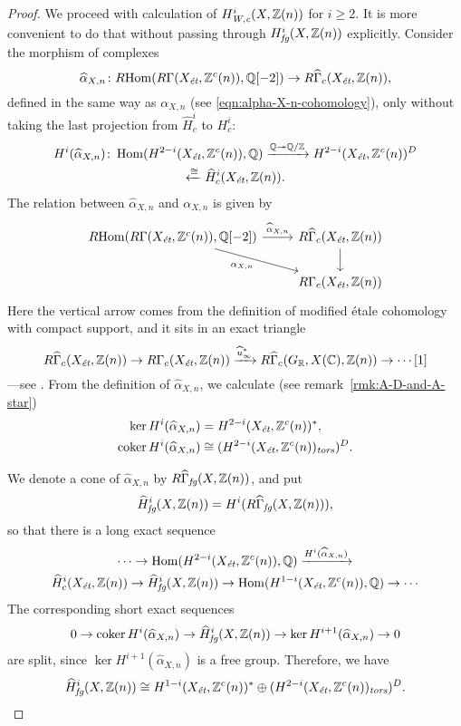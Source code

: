 \documentclass[draft]{article}
\numberwithin{equation}{section}
\begin{document}
\begin{proof}
  \vspace{1em}

  We proceed with calculation of $H^i_\Wc (X, \ZZ(n))$ for $i \ge 2$. It is
  more convenient to do that without passing through $H^i_\fg (X, \ZZ(n))$
  explicitly. Consider the morphism of complexes
  \[ \widehat{\alpha}_{X,n}\colon
    \RHom (R\Gamma (X_\et, \ZZ^c(n)), \QQ[-2]) \to
    R\widehat{\Gamma}_c (X_\et, \ZZ(n)), \]
  defined in the same way as $\alpha_{X,n}$
  (see \eqref{eqn:alpha-X-n-cohomology}), only without taking the last
  projection from $\widehat{H}^i_c$ to $H^i_c$:
  \begin{multline*}
    H^i (\widehat{\alpha}_{X,n})\colon \Hom (H^{2-i} (X_\et, \ZZ^c(n)), \QQ)
    \xrightarrow{\QQ \twoheadrightarrow \QQ/\ZZ}
    H^{2-i} (X_\et, \ZZ^c(n))^D \\
    \xleftarrow{\cong} \widehat{H}^i_c (X_\et, \ZZ(n)).
  \end{multline*}
  The relation between $\widehat{\alpha}_{X,n}$ and $\alpha_{X,n}$
  is given by
  \[ \begin{tikzcd}
      \RHom (R\Gamma (X_\et, \ZZ^c(n)), \QQ[-2]) \ar{r}{\widehat{\alpha}_{X,n}}\ar{dr}[swap]{\alpha_{X,n}} & R\widehat{\Gamma}_c (X_\et, \ZZ(n)) \ar{d} \\
      & R\Gamma_c (X_\et, \ZZ(n))
    \end{tikzcd} \]
  Here the vertical arrow comes from the definition of modified \'{e}tale
  cohomology with compact support, and it sits in an exact triangle
  \[ R\widehat{\Gamma}_c (X_\et, \ZZ(n)) \to
    R\Gamma_c (X_\et, \ZZ(n)) \xrightarrow{\widehat{u}^*_\infty}
    R\widehat{\Gamma}_c (G_\RR, X(\CC), \ZZ(n)) \to \cdots [1] \]
  ---see \cite[Lemma~6.14]{Flach-Morin-2018}.
  From the definition of $\widehat{\alpha}_{X,n}$, we calculate
  (see remark~\ref{rmk:A-D-and-A-star})
  \begin{align*}
    \ker H^i (\widehat{\alpha}_{X,n}) & = H^{2-i} (X_\et, \ZZ^c(n))^*, \\
    \coker H^i (\widehat{\alpha}_{X,n}) & \cong (H^{2-i} (X_\et, \ZZ^c (n))_\tors)^D.
  \end{align*}

  We denote a cone of $\widehat{\alpha}_{X,n}$ by
  $R\widehat{\Gamma}_\fg (X, \ZZ(n))$, and put
  $$\widehat{H}^i_\fg (X, \ZZ(n)) = H^i (R\widehat{\Gamma}_\fg (X, \ZZ(n))),$$
  so that there is a long exact sequence
  \begin{multline*}
    \cdots \to \Hom (H^{2-i} (X_\et, \ZZ^c (n)), \QQ) \xrightarrow{H^i (\widehat{\alpha}_{X,n})} \\
    \widehat{H}^i_c (X_\et, \ZZ(n)) \to
    \widehat{H}^i_\fg (X, \ZZ(n)) \to
    \Hom (H^{1-i} (X_\et, \ZZ^c (n)), \QQ) \to \cdots
  \end{multline*}
  The corresponding short exact sequences
  \[ 0 \to \coker H^i (\widehat{\alpha}_{X,n}) \to
    \widehat{H}^i_\fg (X, \ZZ(n)) \to
    \ker H^{i+1} (\widehat{\alpha}_{X,n}) \to 0 \]
  are split, since $\ker H^{i+1} (\widehat{\alpha}_{X,n})$ is a free
  group. Therefore, we have
  \[ \widehat{H}^i_\fg (X, \ZZ(n)) \cong
    H^{1-i} (X_\et, \ZZ^c(n))^*
    \oplus
    (H^{2-i} (X_\et, \ZZ^c (n))_\tors)^D. \]


\end{proof}
\end{document}
